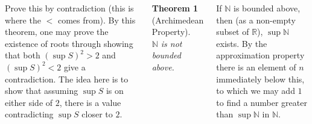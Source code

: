 \documentclass{tikzposter} %
\newtheorem{theorem}{Theorem}
\begin{document}
\begin{columns}
{{    Prove this by contradiction (this is where the $<$ comes from). By this theorem, one may prove the existence of roots through showing that both $(\sup S)^{2} > 2$ and $(\sup S)^{2} < 2$ give a contradiction. The idea here is to show that assuming $\sup S$ is on either side of $2$, there is a value contradicting $\sup S$ closer to $2$.\\

    \begin{theorem}[Archimedean Property]
    \ $\mathbb{N}$ is not bounded above.\\
    \end{theorem}

    If $\mathbb{N}$ is bounded above, then (as a non-empty subset of $\mathbb{R}$), $\sup \mathbb{N}$ exists. By the approximation property there is an element of $n$ immediately below this, to which we may add $1$ to find a number greater than $\sup \mathbb{N}$ in $\mathbb{N}$. \\

  }
}


\end{columns}
\end{document}
